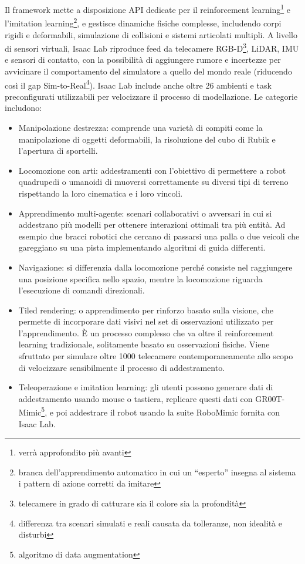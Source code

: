 Il framework mette a disposizione API dedicate per il reinforcement learning\footnote{verrà approfondito più avanti} e l’imitation learning\footnote{branca dell’apprendimento automatico in cui un “esperto” insegna al sistema i pattern di azione corretti da imitare}, e gestisce dinamiche fisiche complesse, includendo corpi rigidi e deformabili, simulazione di collisioni e sistemi articolati multipli. A livello di sensori virtuali, Isaac Lab riproduce feed da telecamere RGB-D\footnote{telecamere in grado di catturare sia il colore sia la profondità}, LiDAR, IMU e sensori di contatto, con la possibilità di aggiungere rumore e incertezze per avvicinare il comportamento del simulatore a quello del mondo reale (riducendo così il gap Sim-to-Real\footnote{differenza tra scenari simulati e reali causata da tolleranze, non idealità e disturbi}). Isaac Lab include anche oltre 26 ambienti e task preconfigurati utilizzabili per velocizzare il processo di modellazione. Le categorie includono:

\begin{itemize}
    \item Manipolazione destrezza: comprende una varietà di compiti come la manipolazione di oggetti deformabili, la risoluzione del cubo di Rubik e l'apertura di sportelli.
    \item Locomozione con arti: addestramenti con l'obiettivo di permettere a robot quadrupedi o umanoidi di muoversi correttamente su diversi tipi di terreno rispettando la loro cinematica e i loro vincoli.
    \item Apprendimento multi-agente: scenari collaborativi o avversari in cui si addestrano più modelli per ottenere interazioni ottimali tra più entità. Ad esempio due bracci robotici che cercano di passarsi una palla o due veicoli che gareggiano su una pista implementando algoritmi di guida differenti.
    \item Navigazione: si differenzia dalla locomozione perché consiste nel raggiungere una posizione specifica nello spazio, mentre la locomozione riguarda l'esecuzione di comandi direzionali.
    \item Tiled rendering: o apprendimento per rinforzo basato sulla visione, che permette di incorporare dati visivi nel set di osservazioni utilizzato per l’apprendimento. È un processo complesso che va oltre il reinforcement learning tradizionale, solitamente basato su osservazioni fisiche. Viene sfruttato per simulare oltre 1000 telecamere contemporaneamente allo scopo di velocizzare sensibilmente il processo di addestramento.
    \item Teleoperazione e imitation learning: gli utenti possono generare dati di addestramento usando mouse o tastiera, replicare questi dati con GR00T-Mimic\footnote{algoritmo di data augmentation}, e poi addestrare il robot usando la suite RoboMimic fornita con Isaac Lab.
\end{itemize}

